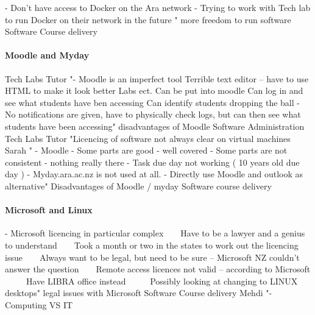 - Don’t have access to Docker on the Ara network
- Trying to work with Tech lab to run Docker on their network in the future
"	more freedom to run software	Software	Course delivery

\paragraph{Moodle and Myday}

Tech Labs Tutor	"- Moodle is an imperfect tool
     Terrible text editor – have to use HTML to make it look better
     Labs ect. Can be put into moodle
     Can log in and see what students have ben accessing
     Can identify students dropping the ball
- No notifications are given, have to physically check logs, but can then see what students have been accessing"	disadvantages of Moodle	Software	Administration
Tech Labs Tutor	"Licencing of software not always clear on virtual machines
Sarah	"
-	Moodle
-	Some parts are good - well covered
-	Some parts are not consistent - nothing really there
-	Task due day not working ( 10 years old due day )
-	Myday.ara.ac.nz is not used at all.
-	Directly use Moodle and outlook as alternative"	Disadvantages of Moodle / myday	Software	course delivery

\paragraph{Microsoft and Linux}

- Microsoft licencing in particular complex
     Have to be a lawyer and a genius to understand
     Took a month or two in the states to work out the licencing issue
     Always want to be legal, but need to be sure – Microsoft NZ couldn’t answer the question
     Remote access licences not valid – according to Microsoft
       Have LIBRA office instead
       Possibly looking at changing to LINUX desktops"	legal issues with Microsoft	Software	Course delivery
Mehdi	"-	Computing VS IT

